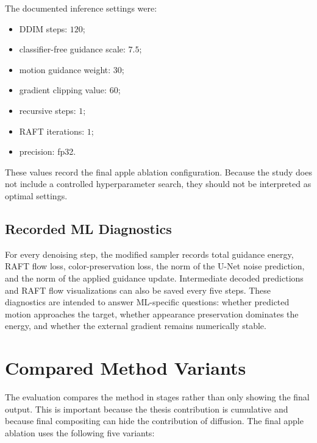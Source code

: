 The documented inference settings were:

\begin{itemize}
  \item DDIM steps: $120$;
  \item classifier-free guidance scale: $7.5$;
  \item motion guidance weight: $30$;
  \item gradient clipping value: $60$;
  \item recursive steps: $1$;
  \item RAFT iterations: $1$;
  \item precision: fp32.
\end{itemize}

These values record the final apple ablation configuration. Because the study does not include a controlled hyperparameter search, they should not be interpreted as optimal settings.

\subsection{Recorded ML Diagnostics}

For every denoising step, the modified sampler records total guidance energy, RAFT flow loss, color-preservation loss, the norm of the U-Net noise prediction, and the norm of the applied guidance update. Intermediate decoded predictions and RAFT flow visualizations can also be saved every five steps. These diagnostics are intended to answer ML-specific questions: whether predicted motion approaches the target, whether appearance preservation dominates the energy, and whether the external gradient remains numerically stable.

\section{Compared Method Variants}

The evaluation compares the method in stages rather than only showing the final output. This is important because the thesis contribution is cumulative and because final compositing can hide the contribution of diffusion. The final apple ablation uses the following five variants:

